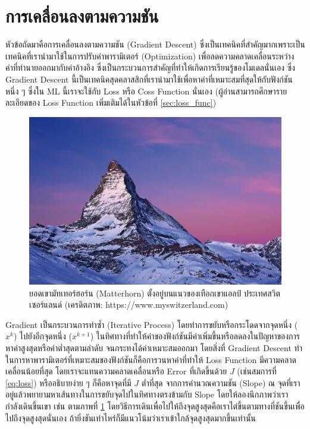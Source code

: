 \section{การเคลื่อนลงตามความชัน}
\label{sec:gradient_descent}

หัวข้อถัดมาคือการเคลื่อนลงตามความชัน (Gradient Descent) ซึ่งเป็นเทคนิคที่สำคัญมากเพราะเป็นเทคนิคที่เรานำมาใช้ในการปรับค่าพารามิเตอร์ 
(Optimization) เพื่อลดความคลาดเคลื่อนระหว่างค่าที่ทำนายออกมากับค่าอ้างอิง ซึ่งเป็นกระบวนการสำคัญที่ทำให้เกิดการเรียนรู้ของโมเดลนั่นเอง
ซึ่ง Gradient Descent นี้เป็นเทคนิคสุดคลาสสิกที่เรานำมาใช้เพื่อหาค่าที่เหมาะสมที่สุดให้กับฟังก์ชันหนึ่ง ๆ ซึ่งใน ML นี้เราจะใช้กับ Loss หรือ 
Coss Function นั่นเอง (ผู้อ่านสามารถศึกษารายละเอียดของ Loss Function เพิ่มเติมได้ในหัวข้อที่ \ref{sec:loss_func})

\begin{figure}[htbp]
    \centering
    \includegraphics[width=0.8\linewidth]{fig/matterhorn.png}
    \caption{ยอดเขามัทเทอร์ฮอร์น (Matterhorn) ตั้งอยู่บนแนวของเทือกเขาแอลป์ ประเทศสวิตเซอร์แลนด์
    (เครดิตภาพ: https://www.myswitzerland.com)}
    \label{fig:matterhorn}
\end{figure}

Gradient เป็นกระบวนการทำซ้ำ (Iterative Process) โดยทําการขยับหรือกระโดดจากจุดหนึ่ง ($x^{k}$) ไปยังอีกจุดหนึ่ง ($x^{k+1}$) 
ในทิศทางที่ทําให้ค่าของฟังก์ชันมีค่าเพิ่มขึ้นหรือลดลงในปัญหาของการหาค่าสูงสุดหรือค่าต่ำสุดตามลำดับ จนกระทงได้ค่าเหมาะสมออกมา โดยสิ่งที่ 
Gradient Descent ทำในการหาพารามิเตอร์ที่เหมาะสมของฟังก์ชันก็คือการวนหาค่าที่ทำให้ Loss Function มีความคลาดเคลื่อนน้อยที่สุด 
โดยเราจะแทนความคลาดเคลื่อนหรือ Error ที่เกิดขึ้นด้วย $J$ (เช่นสมการที่ \ref{eq:loss}) หรืออธิบายง่าย ๆ ก็คือหาจุดที่มี $J$ ต่ำที่สุด%
จากการคำนวณความชัน (Slope) ณ จุดที่เราอยู่แล้วพยายามหาเส้นทางในการขยับจุดไปในทิศทางตรงข้ามกับ Slope โดยให้ลองนึกภาพว่าเรา%
กำลังเดินขึ้นเขา เช่น ตามภาพที่ \ref{fig:matterhorn} โดยวิธีการเดินเพื่อไปให้ถึงจุดสูงสุดคือเราไต่ขึ้นตามทางที่ชันขึ้นเพื่อไปถึงจุดสูงสุดนั่นเอง 
ถ้ายิ่งชันเท่าไหร่ก็มีแนวโน้มว่าเราเข้าใกล้จุดสูงสุดมากขึ้นเท่านั้น

